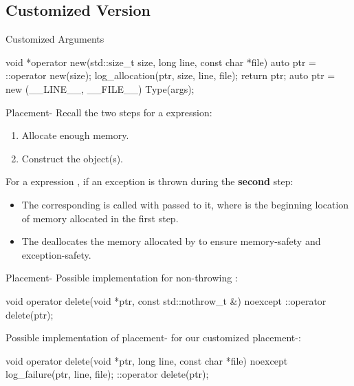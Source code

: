 \documentclass{beamer}
\begin{document}
\subsection{Customized Version}

\begin{frame}[fragile]{Customized Arguments}
  \begin{cpp}
void *operator new(std::size_t size,
                   long line, const char *file) {
  auto ptr = ::operator new(size);
  log_allocation(ptr, size, line, file);
  return ptr;
}
auto ptr = new (__LINE__, __FILE__) Type(args);
  \end{cpp}
\end{frame}

\begin{frame}[fragile]{Placement-}
  Recall the two steps for a  expression:
  \begin{enumerate}
    \item Allocate enough memory.
    \item Construct the object(s).
  \end{enumerate}
  For a  expression , if an exception is thrown during the \textbf{second} step:
  \begin{itemize}
    \item The corresponding  is called with  passed to it, where  is the beginning location of memory allocated in the first step.
    \item The  deallocates the memory allocated by  to ensure memory-safety and exception-safety.
  \end{itemize}
\end{frame}

\begin{frame}[fragile]{Placement-}
  Possible implementation for non-throwing :
  \begin{cpp}
void operator delete(void *ptr,
                     const std::nothrow_t &) noexcept {
  ::operator delete(ptr);
}
  \end{cpp}
  \pause
  Possible implementation of placement- for our customized placement-:
  \begin{cpp}
void operator delete(void *ptr,
            long line, const char *file) noexcept {
  log_failure(ptr, line, file);
  ::operator delete(ptr);
}
  \end{cpp}
\end{frame}
\end{document}
